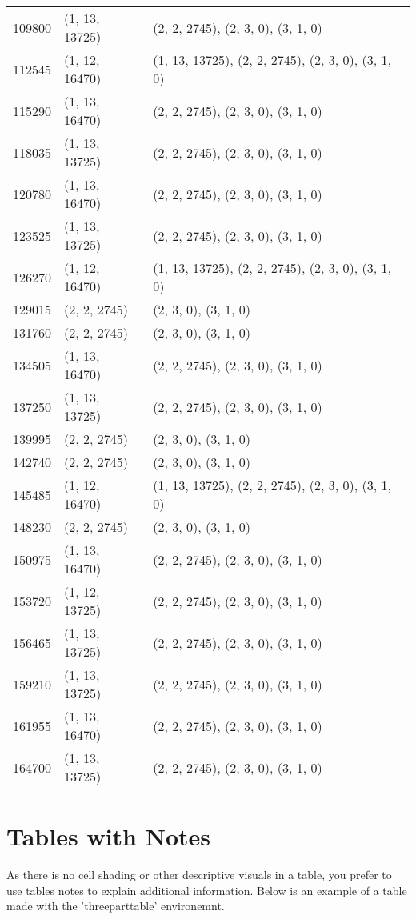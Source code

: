 \begin{longtable}[h!t!]{p{0.6in}p{1in}p{4.4in}}
109800 & (1, 13, 13725) & (2, 2, 2745), (2, 3, 0), (3, 1, 0) \\
112545 & (1, 12, 16470) & (1, 13, 13725), (2, 2, 2745), (2, 3, 0), (3, 1, 0) \\
115290 & (1, 13, 16470) & (2, 2, 2745), (2, 3, 0), (3, 1, 0) \\
118035 & (1, 13, 13725) & (2, 2, 2745), (2, 3, 0), (3, 1, 0) \\
120780 & (1, 13, 16470) & (2, 2, 2745), (2, 3, 0), (3, 1, 0) \\
123525 & (1, 13, 13725) & (2, 2, 2745), (2, 3, 0), (3, 1, 0) \\
126270 & (1, 12, 16470) & (1, 13, 13725), (2, 2, 2745), (2, 3, 0), (3, 1, 0) \\
129015 & (2, 2, 2745) & (2, 3, 0), (3, 1, 0) \\
131760 & (2, 2, 2745) & (2, 3, 0), (3, 1, 0) \\
134505 & (1, 13, 16470) & (2, 2, 2745), (2, 3, 0), (3, 1, 0) \\
137250 & (1, 13, 13725) & (2, 2, 2745), (2, 3, 0), (3, 1, 0) \\
139995 & (2, 2, 2745) & (2, 3, 0), (3, 1, 0) \\
142740 & (2, 2, 2745) & (2, 3, 0), (3, 1, 0) \\
145485 & (1, 12, 16470) & (1, 13, 13725), (2, 2, 2745), (2, 3, 0), (3, 1, 0)\\%
148230 & (2, 2, 2745) & (2, 3, 0), (3, 1, 0) \\
150975 & (1, 13, 16470) & (2, 2, 2745), (2, 3, 0), (3, 1, 0) \\
153720 & (1, 12, 13725) & (2, 2, 2745), (2, 3, 0), (3, 1, 0) \\
156465 & (1, 13, 13725) & (2, 2, 2745), (2, 3, 0), (3, 1, 0) \\
159210 & (1, 13, 13725) & (2, 2, 2745), (2, 3, 0), (3, 1, 0) \\
161955 & (1, 13, 16470) & (2, 2, 2745), (2, 3, 0), (3, 1, 0) \\
164700 & (1, 13, 13725) & (2, 2, 2745), (2, 3, 0), (3, 1, 0) \\
\end{longtable}

\section{Tables with Notes}

As there is no cell shading or other descriptive visuals in a table, you prefer to use tables notes to explain additional information. Below is an example of a table made with the 'threeparttable' environemnt. 

